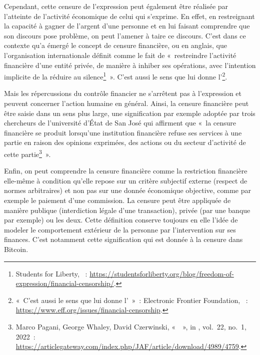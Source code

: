 Cependant, cette censure de l'expression peut également être réalisée par l'atteinte de l'activité économique de celui qui s'exprime. En effet, en restreignant la capacité à gagner de l'argent d'une personne et en lui faisant comprendre que son discours pose problème, on peut l'amener à taire ce discours. C'est dans ce contexte qu'a émergé le concept de censure financière, ou  en anglais, que l'organisation internationale  définit comme le fait de «~restreindre l'activité financière d'une entité privée, de manière à inhiber ses opérations, avec l'intention implicite de la réduire au silence\footnote{Students for Liberty, ~: \url{https://studentsforliberty.org/blog/freedom-of-expression/financial-censorship/}.}~». C'est aussi le sens que lui donne l'\footnote{«~C'est aussi le sens que lui donne l'~»~: Electronic Frontier Foundation, ~: \url{https://www.eff.org/issues/financial-censorship}.}. %

Mais les répercussions du contrôle financier ne s'arrêtent pas à l'expression et peuvent concerner l'action humaine en général. Ainsi, la censure financière peut être saisie dans un sens plus large, une signification par exemple adoptée par trois chercheurs de l'université d'État de San José qui affirment que «~la censure financière se produit lorsqu'une institution financière refuse ses services à une partie en raison des opinions exprimées, des actions ou du secteur d'activité de cette partie\footnote{Marco Pagani, George Whaley, David Czerwinski, «~~», in , vol.~22, no.~1, 2022~: \url{https://articlegateway.com/index.php/JAF/article/download/4989/4759}.}~». %

Enfin, on peut comprendre la censure financière comme la restriction financière elle-même à condition qu'elle repose sur un critère subjectif externe (respect de normes arbitraires) et non pas sur une donnée économique objective, comme par exemple le paiement d'une commission. La censure peut être appliquée de manière publique (interdiction légale d'une transaction), privée (par une banque par exemple) ou les deux. Cette définition conserve toujours en elle l'idée de modeler le comportement extérieur de la personne par l'intervention sur ses finances. C'est notamment cette signification qui est donnée à la censure dans Bitcoin.

